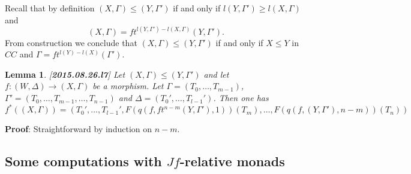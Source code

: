 \documentclass[11pt]{article}
\newenvironment{proof}{{\bf Proof}:}{\vskip 5mm }
\newtheorem{lemma}[proposition]{Lemma}
\newcommand{\llabel}[1]{\label{#1}[{\bf #1}]}
\newcommand{\sr}{\rightarrow}
\begin{document}
Recall that by definition $(X,\Gamma)\le (Y,\Gamma')$ if and only if $l(Y,\Gamma')\ge l(X,\Gamma)$ and 
%
$$(X,\Gamma)=ft^{l(Y,\Gamma')-l(X,\Gamma)}(Y,\Gamma').$$
%
From construction we conclude that $(X,\Gamma)\le (Y,\Gamma')$ if and only if $X\le Y$ in $CC$ and $\Gamma=ft^{l(Y)-l(X)}(\Gamma')$. 
%
\begin{lemma}
\llabel{2015.08.26.l7}
Let $(X,\Gamma)\le (Y,\Gamma')$ and let $f:(W,\Delta)\sr (X,\Gamma)$ be a morphism. Let $\Gamma=(T_0,\dots,T_{m-1})$, $\Gamma'=(T_0,\dots,T_{m-1},\dots,T_{n-1})$ and $\Delta=(T_0',\dots,T_{l-1}')$. Then one has
%
$$f^*((X,\Gamma))=(T_0',\dots,T_{l-1}',F(q(f,ft^{n-m}(Y,\Gamma'),1))(T_m),\dots,F(q(f,(Y,\Gamma'),n-m))(T_n))$$
%
\end{lemma}
%
\begin{proof}
Straightforward by induction on $n-m$. 
\end{proof}











\subsection{Some computations with $Jf$-relative monads}
%
\end{document}
